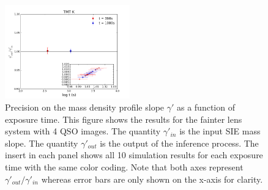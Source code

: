\documentclass[a4paper,11pt]{article}
\begin{document}
{\begin{figure}
\begin{center}
\includegraphics[width=0.48\textwidth]{figures/gamma_135949_4QSOimages_TMT.png}
\end{center}
\caption{Precision on the mass density profile slope $\gamma'$ as a function of exposure time.  This figure shows the results for the fainter lens system with 4 QSO images. The quantity $\gamma'_{in}$ is the input SIE mass slope. The quantity $\gamma'_{out}$ is the output of the inference process.
The insert in each panel shows all 10 simulation results for each exposure time with the same color coding. Note that both axes represent $\gamma'_{out}/\gamma'_{in}$ whereas error bars are only shown on the x-axis for clarity.}
\label{fig:gamma_fainter_4QSOimages}
\end{figure}


}
\end{document}
